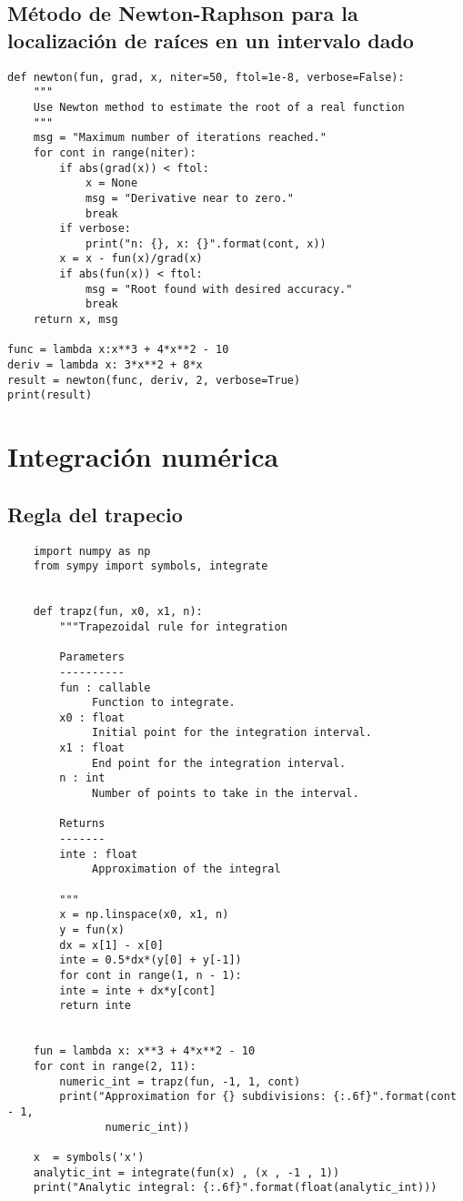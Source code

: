 \subsection{Método de Newton-Raphson para la localización de raíces en un 
intervalo dado}

\begin{verbatim}
def newton(fun, grad, x, niter=50, ftol=1e-8, verbose=False):
    """
    Use Newton method to estimate the root of a real function
    """
    msg = "Maximum number of iterations reached."
    for cont in range(niter):
        if abs(grad(x)) < ftol:
            x = None
            msg = "Derivative near to zero."
            break
        if verbose:
            print("n: {}, x: {}".format(cont, x))
        x = x - fun(x)/grad(x)
        if abs(fun(x)) < ftol:
            msg = "Root found with desired accuracy."
            break
    return x, msg

func = lambda x:x**3 + 4*x**2 - 10
deriv = lambda x: 3*x**2 + 8*x
result = newton(func, deriv, 2, verbose=True)
print(result)
\end{verbatim}



\section{Integración numérica}

\subsection{Regla del trapecio}

\begin{verbatim}
    import numpy as np
    from sympy import symbols, integrate


    def trapz(fun, x0, x1, n):
        """Trapezoidal rule for integration
        
        Parameters
        ----------
        fun : callable
             Function to integrate.
        x0 : float
             Initial point for the integration interval.
        x1 : float
             End point for the integration interval.
        n : int
             Number of points to take in the interval.
        
        Returns
        -------
        inte : float
             Approximation of the integral
        
        """
        x = np.linspace(x0, x1, n)
        y = fun(x)
        dx = x[1] - x[0]
        inte = 0.5*dx*(y[0] + y[-1])
        for cont in range(1, n - 1):
        inte = inte + dx*y[cont]
        return inte


    fun = lambda x: x**3 + 4*x**2 - 10
    for cont in range(2, 11):
        numeric_int = trapz(fun, -1, 1, cont)
        print("Approximation for {} subdivisions: {:.6f}".format(cont - 1,
               numeric_int))

    x  = symbols('x')
    analytic_int = integrate(fun(x) , (x , -1 , 1))
    print("Analytic integral: {:.6f}".format(float(analytic_int)))
\end{verbatim}

